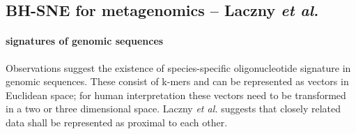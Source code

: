 \documentclass[twocolumn]{bmcart}%
\begin{document}
\subsection*{BH-SNE for metagenomics -- Laczny \textit{et al.}}
\paragraph*{signatures of genomic sequences}
Observations suggest the existence of species-specific oligonucleotide signature in genomic sequences. \cite{Cheng1194}\cite{Laczny2014} These consist of k-mers and can be represented as vectors in Euclidean space; for human interpretation these vectors need to be transformed in a two or three dimensional space.\cite{Laczny2014} Laczny \textit{et al.} suggests that closely related data shall be represented as proximal to each other.
\end{document}
